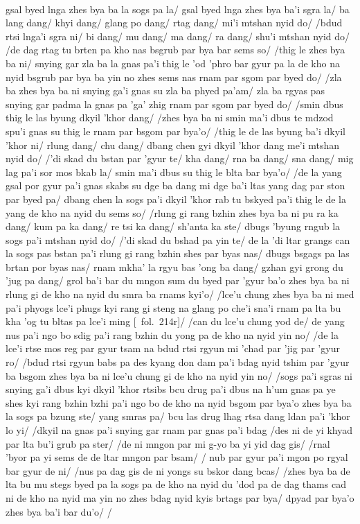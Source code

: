 \documentclass[12pt]{article}
\begin{document}
\textbf{\TVA}\\
gsal byed lnga zhes bya ba la sogs pa la/ gsal byed lnga zhes bya ba'i sgra la/ ba lang dang/ khyi dang/ glang po dang/ rtag dang/ mi'i mtshan nyid do/ /bdud rtsi lnga'i sgra ni/ bi dang/ mu dang/ ma dang/ ra dang/ shu'i mtshan nyid do/ /de dag rtag tu brten pa kho nas bsgrub par bya bar sems so/ /thig le zhes bya ba ni/ snying gar zla ba la gnas pa'i thig le 'od 'phro bar gyur pa la de kho na nyid bsgrub par bya ba yin no zhes sems nas rnam par sgom par byed do/ /zla ba zhes bya ba ni snying ga'i gnas su zla ba phyed pa'am/ zla ba rgyas pas snying gar padma la gnas pa 'ga' zhig rnam par sgom par byed do/ /smin dbus thig le las byung dkyil 'khor dang/ /zhes bya ba ni smin ma'i dbus te mdzod spu'i gnas su thig le rnam par bsgom par bya'o/ /thig le de las byung ba'i dkyil 'khor ni/ rlung dang/ chu dang/ dbang chen gyi dkyil 'khor dang me'i mtshan nyid do/ /'di skad du bstan par 'gyur te/ kha dang/ rna ba dang/ sna dang/ mig lag pa'i sor mos bkab la/ smin ma'i dbus su thig le blta bar bya'o/ /de la yang gsal por gyur pa'i gnas skabs su dge ba dang mi dge ba'i ltas yang dag par ston par byed pa/ dbang chen la sogs pa'i dkyil 'khor rab tu bskyed pa'i thig le de la yang de kho na nyid du sems so/ /rlung gi rang bzhin zhes bya ba ni pu ra ka dang/ kum pa ka dang/ re tsi ka dang/ sh'anta ka ste/ dbugs 'byung rngub la sogs pa'i mtshan nyid do/ /'di skad du bshad pa yin te/ de la 'di ltar grangs can la sogs pas bstan pa'i rlung gi rang bzhin shes par byas nas/ dbugs bsgags pa las brtan por byas nas/ rnam mkha' la rgyu bas 'ong ba dang/ gzhan gyi grong du 'jug pa dang/ grol ba'i bar du mngon sum du byed par 'gyur ba'o zhes bya ba ni rlung gi de kho na nyid du smra ba rnams kyi'o/ /lce'u chung zhes bya ba ni med pa'i phyogs lce'i phugs kyi rang gi steng na glang po che'i sna'i rnam pa lta bu kha 'og tu bltas pa lce'i ming [\TVA\ fol.\ 214r]/ /can du lce'u chung yod de/ de yang nus pa'i ngo bo sdig pa'i rang bzhin du yong pa de kho na nyid yin no/ /de la lce'i rtse mos reg par gyur tsam na bdud rtsi rgyun mi 'chad par 'jig par 'gyur ro/ /bdud rtsi rgyun babs pa des kyang don dam pa'i bdag nyid tshim par 'gyur ba bsgom zhes bya ba ni lce'u chung gi de kho na nyid yin no/ /sogs pa'i sgras ni snying ga'i dbus kyi dkyil 'khor rtsibs bcu drug pa'i dbus na h'um gnas pa ye shes kyi rang bzhin bzhi pa'i ngo bo de kho na nyid bsgom par bya'o zhes bya ba la sogs pa bzung ste/ yang smras pa/ bcu las drug lhag rtsa dang ldan pa'i 'khor lo yi/ /dkyil na gnas pa'i snying gar rnam par gnas pa'i bdag /des ni de yi khyad par lta bu'i grub pa ster/ /de ni mngon par mi g-yo ba yi yid dag gis/ /rnal 'byor pa yi sems de de ltar mngon par bsam/ / nub par gyur pa'i mgon po rgyal bar gyur de ni/ /nus pa dag gis de ni yongs su bskor dang bcas/ /zhes bya ba de lta bu mu stegs byed pa la sogs pa de kho na nyid du 'dod pa de dag thams cad ni de kho na nyid ma yin no zhes bdag nyid kyis brtags par bya/ dpyad par bya'o zhes bya ba'i bar du'o/ /\\
\end{document}
